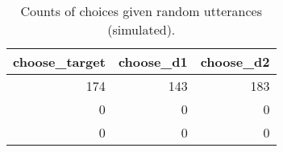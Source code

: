 \begin{table}[!ht]
\centering
\begin{table}
\caption{Counts of choices given random utterances (simulated).}
\label{tab:fig06}
\begin{tabular}{rrr}
\toprule
choose\_target & choose\_d1 & choose\_d2 \\
\midrule
174 & 143 & 183 \\
0 & 0 & 0 \\
0 & 0 & 0 \\
\bottomrule
\end{tabular}
\end{table}
\end{table}
